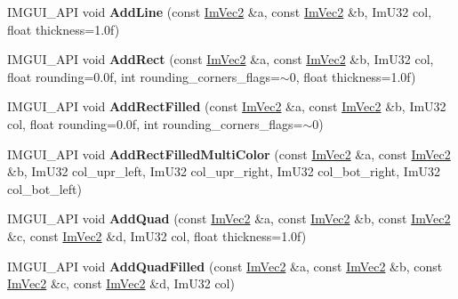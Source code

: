 \begin{DoxyCompactItemize}
\mbox{\label{struct_im_draw_list_a6db76ca2506dc86ad4d602fdcd2e2ea8}} 
I\+M\+G\+U\+I\+\_\+\+A\+PI void {\bfseries Add\+Line} (const \hyperlink{struct_im_vec2}{Im\+Vec2} \&a, const \hyperlink{struct_im_vec2}{Im\+Vec2} \&b, Im\+U32 col, float thickness=1.\+0f)
\item 
\mbox{\label{struct_im_draw_list_a6738c7d0b696273a37808554e1f15a0a}} 
I\+M\+G\+U\+I\+\_\+\+A\+PI void {\bfseries Add\+Rect} (const \hyperlink{struct_im_vec2}{Im\+Vec2} \&a, const \hyperlink{struct_im_vec2}{Im\+Vec2} \&b, Im\+U32 col, float rounding=0.\+0f, int rounding\+\_\+corners\+\_\+flags=$\sim$0, float thickness=1.\+0f)
\item 
\mbox{\label{struct_im_draw_list_a1fa7c9165958909bba53c9740a607872}} 
I\+M\+G\+U\+I\+\_\+\+A\+PI void {\bfseries Add\+Rect\+Filled} (const \hyperlink{struct_im_vec2}{Im\+Vec2} \&a, const \hyperlink{struct_im_vec2}{Im\+Vec2} \&b, Im\+U32 col, float rounding=0.\+0f, int rounding\+\_\+corners\+\_\+flags=$\sim$0)
\item 
\mbox{\label{struct_im_draw_list_ab658e574f3ef67a8d6cc0a86f13f5176}} 
I\+M\+G\+U\+I\+\_\+\+A\+PI void {\bfseries Add\+Rect\+Filled\+Multi\+Color} (const \hyperlink{struct_im_vec2}{Im\+Vec2} \&a, const \hyperlink{struct_im_vec2}{Im\+Vec2} \&b, Im\+U32 col\+\_\+upr\+\_\+left, Im\+U32 col\+\_\+upr\+\_\+right, Im\+U32 col\+\_\+bot\+\_\+right, Im\+U32 col\+\_\+bot\+\_\+left)
\item 
\mbox{\label{struct_im_draw_list_ac3fd62862000b2a7a4e7f61da0a4e3fd}} 
I\+M\+G\+U\+I\+\_\+\+A\+PI void {\bfseries Add\+Quad} (const \hyperlink{struct_im_vec2}{Im\+Vec2} \&a, const \hyperlink{struct_im_vec2}{Im\+Vec2} \&b, const \hyperlink{struct_im_vec2}{Im\+Vec2} \&c, const \hyperlink{struct_im_vec2}{Im\+Vec2} \&d, Im\+U32 col, float thickness=1.\+0f)
\item 
\mbox{\label{struct_im_draw_list_abefdc71c2dc6b6331193aee3ff680ed0}} 
I\+M\+G\+U\+I\+\_\+\+A\+PI void {\bfseries Add\+Quad\+Filled} (const \hyperlink{struct_im_vec2}{Im\+Vec2} \&a, const \hyperlink{struct_im_vec2}{Im\+Vec2} \&b, const \hyperlink{struct_im_vec2}{Im\+Vec2} \&c, const \hyperlink{struct_im_vec2}{Im\+Vec2} \&d, Im\+U32 col)
\item 

\end{DoxyCompactItemize}
